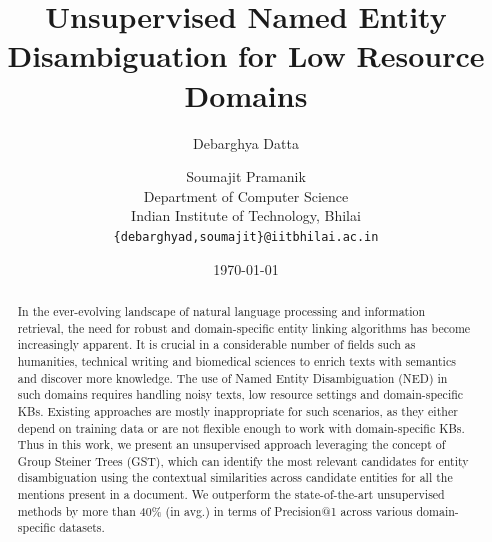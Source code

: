 \documentclass[11pt]{article}
\date{\today}
\author{
Debarghya Datta \and Soumajit Pramanik \\
Department of Computer Science\\
Indian Institute of Technology, Bhilai\\
\texttt{\{debarghyad,soumajit\}@iitbhilai.ac.in}\\
}
\title{Unsupervised Named Entity Disambiguation for Low Resource Domains}
\begin{document}
\maketitle
\begin{abstract}
In the ever-evolving landscape of natural language processing and
information retrieval, the need for robust and domain-specific entity
linking algorithms has become increasingly apparent. It is crucial in
a considerable number of fields such as humanities, technical writing and
biomedical sciences to enrich texts with semantics and discover more
knowledge. The use of Named Entity Disambiguation (NED) in such domains requires handling noisy
texts, low resource settings and domain-specific KBs.  Existing
approaches are mostly inappropriate for such scenarios, as they either depend on
training data or are not flexible enough to work with domain-specific KBs. Thus in this work, we present an unsupervised approach leveraging
the concept of Group Steiner Trees (GST), which can identify the most relevant candidates for entity disambiguation using the
contextual similarities across candidate entities for all the mentions present in a document. We outperform the state-of-the-art unsupervised methods by more than 40\% (in avg.) in terms of Precision@1 across various domain-specific datasets.

\end{abstract}

\end{document}
